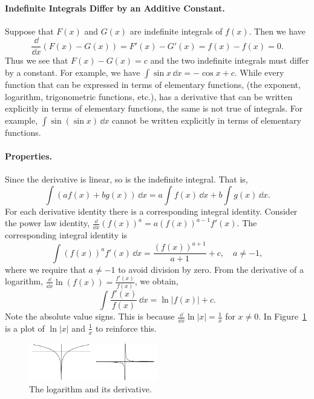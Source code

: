 \paragraph{Indefinite Integrals Differ by an Additive Constant.}
Suppose that $F(x)$ and $G(x)$ are indefinite integrals of $f(x)$.  Then
we have
\[
\frac{\dd}{\dd x} (F(x) - G(x)) = F'(x) - G'(x) = f(x) - f(x) = 0.
\]
Thus we see that $F(x) - G(x) = c$ and the two indefinite integrals must
differ by a constant.  For example, we have $\int \sin x \,\dd x = - \cos x + c$.
While every function that can be expressed in terms of elementary functions,
(the exponent, logarithm, trigonometric functions, etc.), has a derivative
that can be written explicitly in terms of elementary functions, the same
is not true of integrals.  For example, $\int \sin(\sin x) \,\dd x$ cannot
be written explicitly in terms of elementary functions.



\paragraph{Properties.}
Since the derivative is linear, so is the indefinite integral.  That is,
\[
\int ( a f(x) + b g(x) ) \,\dd x = a \int f(x) \,\dd x + b \int g(x) \,\dd x.
\]
For each derivative identity there is a corresponding integral 
identity.  Consider the power law identity, 
$\frac{\dd}{\dd x} (f(x))^a = a (f(x))^{a-1} f'(x)$.  The corresponding 
integral identity is
\[
\int (f(x))^a f'(x) \,\dd x = \frac{(f(x))^{a+1}}{a+1} + c, \quad a \neq -1,
\]
where we require that $a \neq -1$ to avoid division by zero.  From the
derivative of a logarithm, $\frac{\dd}{\dd x} \ln( f(x) ) = \frac{f'(x)}{f(x)}$,
we obtain,
\[
\int \frac{f'(x)}{f(x)} \,\dd x = \ln| f(x) | + c.
\]
Note the absolute value signs.  This is because 
$\frac{\dd}{\dd x} \ln|x| = \frac{1}{x}$ for $x \neq 0$.  In Figure~\ref{log1ox}
is a plot of $\ln|x|$ and $\frac{1}{x}$ to reinforce this.

\begin{figure}[h]
  \begin{center}
    \includegraphics[width=0.5\textwidth]{calculus/integral/log1ox}
  \end{center}
  \caption{The logarithm and its derivative.}
  \label{log1ox}
\end{figure}






